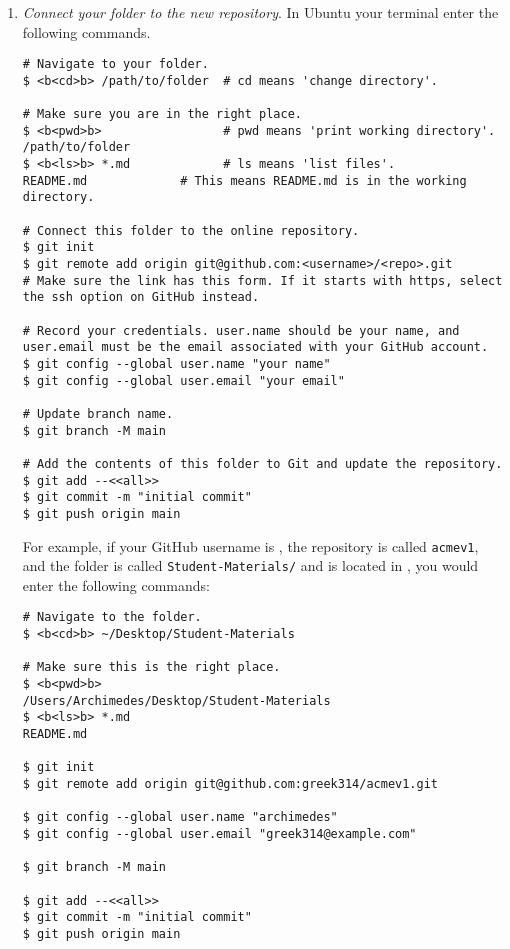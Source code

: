 \begin{enumerate}
    \item \emph{Connect your folder to the new repository}.
    \label{step:connect-folder}
    In 
    \ifwindows
    Ubuntu
    \else
    your terminal
    \fi 
    enter the following commands.
\begin{lstlisting}
# Navigate to your folder.
$ <b<cd>b> /path/to/folder  # cd means 'change directory'.

# Make sure you are in the right place.
$ <b<pwd>b>                 # pwd means 'print working directory'.
/path/to/folder
$ <b<ls>b> *.md             # ls means 'list files'.
README.md             # This means README.md is in the working directory.

# Connect this folder to the online repository.
$ git init
$ git remote add origin git@github.com:<username>/<repo>.git
# Make sure the link has this form. If it starts with https, select the ssh option on GitHub instead.

# Record your credentials. user.name should be your name, and user.email must be the email associated with your GitHub account.
$ git config --global user.name "your name"
$ git config --global user.email "your email"

# Update branch name.
$ git branch -M main

# Add the contents of this folder to Git and update the repository.
$ git add --<<all>>
$ git commit -m "initial commit"
$ git push origin main
\end{lstlisting}
    
    For example, if your GitHub username is , the repository is called \texttt{acmev1}, and the folder is called \texttt{Student-Materials/} and is located in , you would enter the following commands:
\begin{lstlisting}
# Navigate to the folder.
$ <b<cd>b> ~/Desktop/Student-Materials

# Make sure this is the right place.
$ <b<pwd>b>
/Users/Archimedes/Desktop/Student-Materials
$ <b<ls>b> *.md
README.md

$ git init
$ git remote add origin git@github.com:greek314/acmev1.git

$ git config --global user.name "archimedes"
$ git config --global user.email "greek314@example.com"

$ git branch -M main

$ git add --<<all>>
$ git commit -m "initial commit"
$ git push origin main
\end{lstlisting}
    

\end{enumerate}
